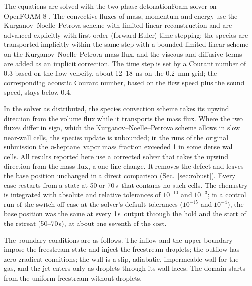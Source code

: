 \documentclass[aip,pof,preprint,amsmath,amssymb]{revtex4-2}
\newcommand{\us}{\,\textmu s}
\newcommand{\nh}{\textit{n}-heptane}
\begin{document}
The equations are solved with the two-phase detonationFoam solver \cite{Sun2023detonationfoam,detonationFoamSoftware} on OpenFOAM-8 \cite{Weller1998}. The convective fluxes of mass, momentum and energy use the Kurganov--Noelle--Petrova scheme \cite{Kurganov2001} with limited-linear reconstruction and are advanced explicitly with first-order (forward Euler) time stepping; the species are transported implicitly within the same step with a bounded limited-linear scheme on the Kurganov--Noelle--Petrova mass flux, and the viscous and diffusive terms are added as an implicit correction. The time step is set by a Courant number of 0.3 based on the flow velocity, about 12--18~ns on the 0.2~mm grid; the corresponding acoustic Courant number, based on the flow speed plus the sound speed, stays below 0.4.

In the solver as distributed, the species convection scheme takes its upwind direction from the volume flux while it transports the mass flux. Where the two fluxes differ in sign, which the Kurganov--Noelle--Petrova scheme allows in slow near-wall cells, the species update is unbounded; in the runs of the original submission the \nh\ vapor mass fraction exceeded 1 in some dense wall cells. All results reported here use a corrected solver that takes the upwind direction from the mass flux, a one-line change. It removes the defect and leaves the base position unchanged in a direct comparison (Sec.~\ref{sec:robust}). Every case restarts from a state at 50 or 70\us\ that contains no such cells. The chemistry is integrated with absolute and relative tolerances of $10^{-10}$ and $10^{-3}$; in a control run of the switch-off case at the solver's default tolerances ($10^{-15}$ and $10^{-4}$), the base position was the same at every 1\us\ output through the hold and the start of the retreat (50--70\us), at about one seventh of the cost. %

The boundary conditions are as follows. The inflow and the upper boundary impose the freestream state and inject the freestream droplets; the outflow has zero-gradient conditions; the wall is a slip, adiabatic, impermeable wall for the gas, and the jet enters only as droplets through its wall faces. The domain starts from the uniform freestream without droplets.
\end{document}

